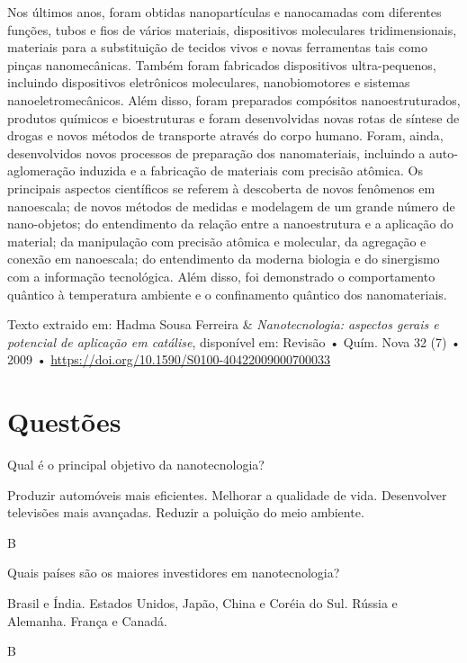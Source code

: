 \documentclass[10pt]{scrartcl}
\begin{document}
Nos últimos anos, foram obtidas nanopartículas e nanocamadas com diferentes funções, tubos e fios de vários materiais, dispositivos moleculares tridimensionais, materiais para a substituição de tecidos vivos e novas ferramentas tais como pinças nanomecânicas. Também foram fabricados dispositivos ultra-pequenos, incluindo dispositivos eletrônicos moleculares, nanobiomotores e sistemas nanoeletromecânicos. Além disso, foram preparados compósitos nanoestruturados, produtos químicos e bioestruturas e foram desenvolvidas novas rotas de síntese de drogas e novos métodos de transporte através do corpo humano. Foram, ainda, desenvolvidos novos processos de preparação dos nanomateriais, incluindo a auto-aglomeração induzida e a fabricação de materiais com precisão atômica. Os principais aspectos científicos se referem à descoberta de novos fenômenos em nanoescala; de novos métodos de medidas e modelagem de um grande número de nano-objetos; do entendimento da relação entre a nanoestrutura e a aplicação do material; da manipulação com precisão atômica e molecular, da agregação e conexão em nanoescala; do entendimento da moderna biologia e do sinergismo com a informação tecnológica. Além disso, foi demonstrado o comportamento quântico à temperatura ambiente e o confinamento quântico dos nanomateriais.


Texto extraido em: Hadma Sousa Ferreira \& \emph{Nanotecnologia: aspectos gerais e potencial de aplicação em catálise}, disponível em: Revisão • Quím. Nova 32 (7) • 2009 • \url{https://doi.org/10.1590/S0100-40422009000700033} 


\section{Questões}
\label{sec:org34ff230}


\begin{exercise}[points=1]
Qual é o principal objetivo da nanotecnologia?
\begin{choice}
\choice Produzir automóveis mais eficientes.
\choice Melhorar a qualidade de vida.
\choice Desenvolver televisões mais avançadas.
\choice Reduzir a poluição do meio ambiente.
\end{choice}
\end{exercise}
\begin{solution}
B
\end{solution}

\begin{exercise}[points=1]
Quais países são os maiores investidores em nanotecnologia?

\begin{choice}
\choice Brasil e Índia.
\choice Estados Unidos, Japão, China e Coréia do Sul.
\choice Rússia e Alemanha.
\choice França e Canadá.
\end{choice}
\end{exercise}
\begin{solution}
B
\end{solution}
\end{document}
